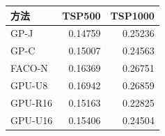 \begin{tabular}{@{}lrr@{}}
\toprule
方法 & TSP500 & TSP1000 \\ \midrule
GP-J & 0.14759 & 0.25236 \\
GP-C & 0.15007 & 0.24563 \\
FACO-N & 0.16369 & 0.26751 \\
GPU-U8 & 0.16942 & 0.26859 \\
GPU-R16 & 0.15163 & 0.22825 \\
GPU-U16 & 0.15406 & 0.24504 \\
\bottomrule
\end{tabular}
